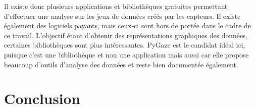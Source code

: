 \documentclass[12pt]{article}
\begin{document}
Il existe donc plusieurs applications et bibliothèques gratuites permettant
d'effectuer une analyse sur les jeux de données créés par les capteurs. Il
existe également des logiciels payants, mais ceux-ci sont hors de portée dans le
cadre de ce travail. L'objectif étant d'obtenir des représentations graphiques
des données, certaines bibliothèques sont plus intéressantes. PyGaze est le
candidat idéal ici, puisque c'est une bibliothèque et non une application mais
aussi car elle propose beaucoup d'outils d'analyse des données et reste bien
documentée également.


\section{Conclusion}


\pagebreak


\end{document}
